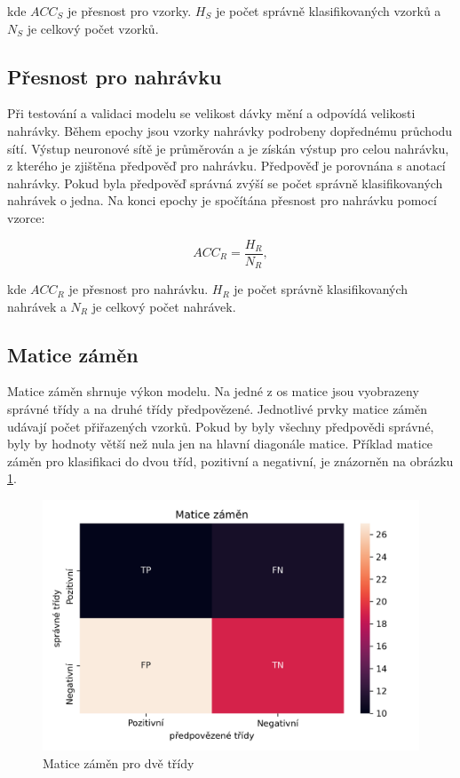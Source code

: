 \documentclass[FM,BP]{tulthesis}
\begin{document}
kde $ ACC_S $ je přesnost pro vzorky. $ H_S $ je počet správně klasifikovaných vzorků a $ N_S $ je celkový počet vzorků.

\subsection{Přesnost pro nahrávku} %
Při testování a validaci modelu se velikost dávky mění a odpovídá velikosti nahrávky. Během epochy jsou vzorky nahrávky podrobeny dopřednému průchodu sítí. Výstup neuronové sítě je průměrován a je získán výstup pro celou nahrávku, z kterého je zjištěna předpověď pro nahrávku. Předpověď je porovnána s anotací nahrávky. Pokud byla předpověď správná zvýší se počet správně klasifikovaných nahrávek o jedna. Na konci epochy je spočítána přesnost pro nahrávku pomocí vzorce:

\begin{equation}
\label{eqn:accuracy_recordings}
ACC_R = \frac{H_R}{N_R},
\end{equation}

kde $ ACC_R $ je přesnost pro nahrávku. $ H_R $ je počet správně klasifikovaných nahrávek a $ N_R $ je celkový počet nahrávek.

\subsection{Matice záměn} %
Matice záměn shrnuje výkon modelu. Na jedné z os matice jsou vyobrazeny správné třídy a na druhé třídy předpovězené. Jednotlivé prvky matice záměn udávají počet přiřazených vzorků. Pokud by byly všechny předpovědi správné, byly by hodnoty větší než nula jen na hlavní diagonále matice. Příklad matice záměn pro klasifikaci do dvou tříd, pozitivní a negativní, je znázorněn na obrázku \mbox{\ref{fig:conf_matrix-example}}.

\begin{figure}[ht]
\centerline{\includegraphics[scale=.6]{conf_matrix-example.png}}
\caption{Matice záměn pro dvě třídy}
\label{fig:conf_matrix-example}
\end{figure}
\FloatBarrier
\end{document}
